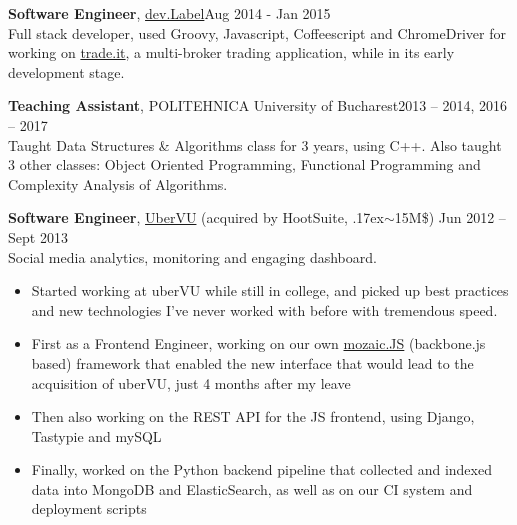 \documentclass[line, margin]{resume}
\newcommand{\bettertilde}{\raise.17ex\hbox{$\scriptstyle\mathtt{\sim}$}}
\begin{document}
\begin{resume}
\textbf{Software Engineer}, \href{http://devlabel.com/}{dev.Label}\hfill Aug 2014 - Jan 2015\\
Full stack developer, used Groovy, Javascript, Coffeescript and ChromeDriver for working on \href{https://www.trade.it/}{trade.it}, a multi-broker trading application, while in its early development stage.

\textbf{Teaching Assistant}, POLITEHNICA University of Bucharest\hfill 2013 -- 2014, 2016 -- 2017\\
Taught Data Structures \& Algorithms class for 3 years, using C++. Also taught 3 other classes: Object Oriented Programming, Functional Programming and Complexity Analysis of Algorithms.

\textbf{Software Engineer}, \href{http://ubervu.com}{UberVU} (acquired by HootSuite, \bettertilde15M\$) \hfill Jun 2012 -- Sept 2013\\
Social media analytics, monitoring and engaging dashboard.
\begin{itemize} \itemsep -2pt  %
	\item Started working at uberVU while still in college, and picked up best practices and new technologies I've never worked with before with tremendous speed.
	\item First as a Frontend Engineer, working on our own \href{https://github.com/uberVU/mozaic/}{mozaic.JS} (backbone.js based) framework that enabled the new interface that would lead to the acquisition of uberVU, just 4 months after my leave
    \item Then also working on the REST API for the JS frontend, using Django, Tastypie and mySQL
    \item Finally, worked on the Python backend pipeline that collected and indexed data into MongoDB and ElasticSearch, as well as on our CI system and deployment scripts
\end{itemize}




\end{resume}
\end{document}
